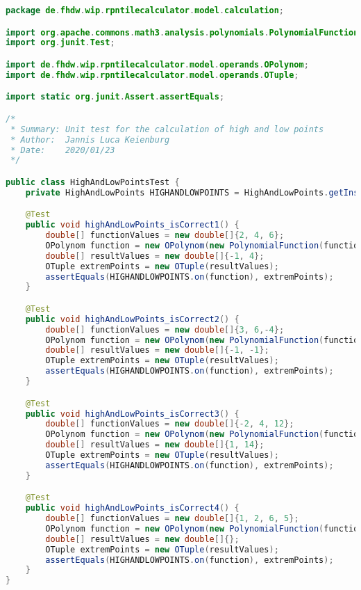 \begin{lstlisting}[caption=HighAndLowPointsTest (Keienburg),label=list:HighAndLowPointsTest,language=Java]
package de.fhdw.wip.rpntilecalculator.model.calculation;

import org.apache.commons.math3.analysis.polynomials.PolynomialFunction;
import org.junit.Test;

import de.fhdw.wip.rpntilecalculator.model.operands.OPolynom;
import de.fhdw.wip.rpntilecalculator.model.operands.OTuple;

import static org.junit.Assert.assertEquals;

/*
 * Summary: Unit test for the calculation of high and low points
 * Author:  Jannis Luca Keienburg
 * Date:    2020/01/23
 */

public class HighAndLowPointsTest {
    private HighAndLowPoints HIGHANDLOWPOINTS = HighAndLowPoints.getInstance();

    @Test
    public void highAndLowPoints_isCorrect1() {
        double[] functionValues = new double[]{2, 4, 6};
        OPolynom function = new OPolynom(new PolynomialFunction(functionValues));
        double[] resultValues = new double[]{-1, 4};
        OTuple extremPoints = new OTuple(resultValues);
        assertEquals(HIGHANDLOWPOINTS.on(function), extremPoints);
    }

    @Test
    public void highAndLowPoints_isCorrect2() {
        double[] functionValues = new double[]{3, 6,-4};
        OPolynom function = new OPolynom(new PolynomialFunction(functionValues));
        double[] resultValues = new double[]{-1, -1};
        OTuple extremPoints = new OTuple(resultValues);
        assertEquals(HIGHANDLOWPOINTS.on(function), extremPoints);
    }

    @Test
    public void highAndLowPoints_isCorrect3() {
        double[] functionValues = new double[]{-2, 4, 12};
        OPolynom function = new OPolynom(new PolynomialFunction(functionValues));
        double[] resultValues = new double[]{1, 14};
        OTuple extremPoints = new OTuple(resultValues);
        assertEquals(HIGHANDLOWPOINTS.on(function), extremPoints);
    }

    @Test
    public void highAndLowPoints_isCorrect4() {
        double[] functionValues = new double[]{1, 2, 6, 5};
        OPolynom function = new OPolynom(new PolynomialFunction(functionValues));
        double[] resultValues = new double[]{};
        OTuple extremPoints = new OTuple(resultValues);
        assertEquals(HIGHANDLOWPOINTS.on(function), extremPoints);
    }
}
\end{lstlisting} 

